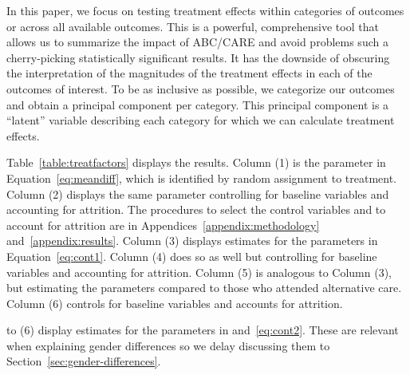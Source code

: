 In this paper, we focus on testing treatment effects within categories of outcomes or across all available outcomes. This is a powerful, comprehensive tool that allows us to summarize the impact of ABC/CARE and avoid problems such a cherry-picking statistically significant results. It has the downside of obscuring the interpretation of the magnitudes of the treatment effects in each of the outcomes of interest. To be as inclusive as possible, we categorize our outcomes and obtain a principal component per category. This principal component is a ``latent'' variable describing each category for which we can calculate treatment effects.

Table~\ref{table:treatfactors} displays the results. Column (1) is the parameter in Equation~\eqref{eq:meandiff}, which is identified by random assignment to treatment. Column (2) displays the same parameter controlling for baseline variables and accounting for attrition. The procedures to select the control variables and to account for attrition are in Appendices~\ref{appendix:methodology} and~\ref{appendix:results}. Column (3) displays estimates for the parameters in Equation~\eqref{eq:cont1}. Column (4) does so as well but controlling for baseline variables and accounting for attrition. Column (5) is analogous to Column (3), but estimating the parameters compared to those who attended alternative care. Column (6) controls for baseline variables and accounts for attrition.


to (6) display estimates for the parameters in  and~\eqref{eq:cont2}. These are relevant when explaining gender differences so we delay discussing them to Section~\ref{sec:gender-differences}.

